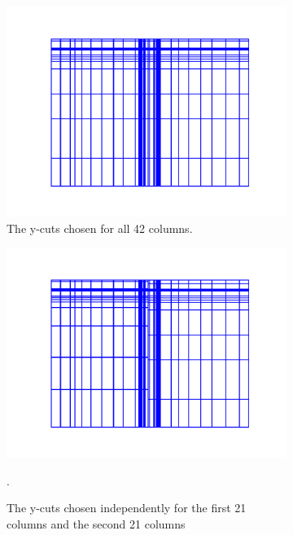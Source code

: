 \begin{figure}[h]
\centering
  \begin{subfigure}[t]{\textwidth}
    \centering
\includegraphics[scale=0.5]{../../figures/lvl2_suite_0.pdf}
  \caption{The y-cuts chosen for all 42 columns.}
    \label{42}
  \end{subfigure}
  \begin{subfigure}[b]{\textwidth}
    \centering
\includegraphics[scale=0.5]{../../figures/lvl2_suite_1.pdf}
    \caption{The y-cuts chosen independently for the first 21 columns and the second 21 columns}.
    \label{21}
  \end{subfigure}
  \begin{subfigure}[b]{\textwidth}

\end{subfigure}
\end{figure}
